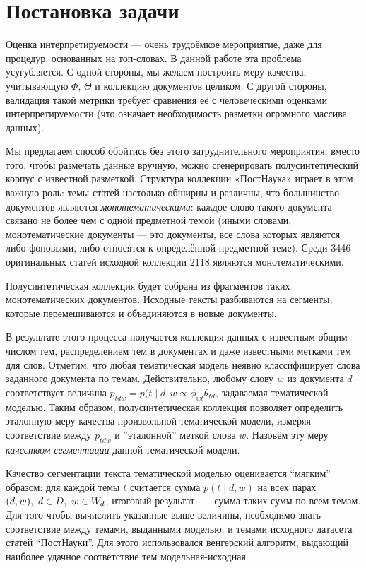 \section{Постановка задачи}

Оценка интерпретируемости --- очень трудоёмкое мероприятие, даже для процедур, основанных на топ-словах.
В данной работе эта проблема усугубляется. С одной стороны, мы желаем построить меру качества, учитывающую $\Phi$, $\Theta$ и коллекцию документов целиком. С другой стороны, валидация такой метрики требует сравнения её с человеческими оценками интерпретируемости (что означает необходимость разметки огромного массива данных).

Мы предлагаем способ обойтись без этого затруднительного мероприятия: вместо того, чтобы размечать данные вручную, можно сгенерировать полусинтетический корпус с известной разметкой. Структура коллекции «ПостНаука» играет в этом важную роль: темы статей настолько обширны и различны, что большинство документов являются \textit{монотематическими}: каждое слово такого документа связано не более чем с одной предметной темой (иными словами, монотематические документы --- это документы, все слова которых являются либо фоновыми, либо относятся к определённой предметной теме). Среди 3446 оригинальных статей исходной коллекции 2118 являются монотематическими.

Полусинтетическая коллекция будет собрана из фрагментов таких монотематических документов. Исходные тексты разбиваются на сегменты, которые перемешиваются и объединяются в новые документы.


В результате этого процесса получается коллекция данных с известным общим числом тем, распределением тем в документах и даже известными метками тем для слов. Отметим, что любая тематическая модель неявно классифицирует слова заданного документа по темам. Действительно, любому слову $w$ из документа $d$ соответствует величина $p_{tdw} = p(t \mid d, w \propto \phi_{wt}\theta_{td}$, задаваемая тематической моделью. Таким образом, полусинтетическая коллекция позволяет определить эталонную меру качества произвольной тематической модели, измеряя соответствие между $p_{tdw}$ и ''эталонной'' меткой слова $w$. Назовём эту меру \textit{качеством сегментации} данной тематической модели.

Качество сегментации текста тематической моделью оценивается ``мягким'' образом: для каждой темы $t$ считается сумма $p(t \mid d, w)$ на всех парах $(d, w),\ d \hm\in D,\ w \hm\in W_d$, итоговый результат~---~сумма таких сумм по всем темам. Для того чтобы вычислить указанные выше величины, необходимо знать соответствие между темами, выданными моделью, и темами исходного датасета статей ``ПостНауки''. Для этого использовался венгерский алгоритм, выдающий наиболее удачное соответствие тем модельная-исходная.

